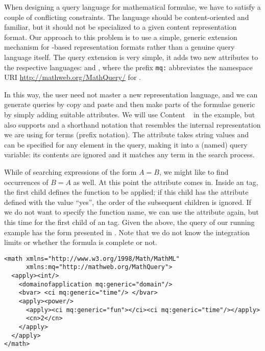 When designing a query language for mathematical formulae, we have to satisfy a couple of
conflicting constraints. The language should be content-oriented and familiar, but it
should not be specialized to a given content representation format.  Our approach to this
problem is to use a simple, generic extension mechanism for {\xml}-based representation
formats rather than a genuine query language itself.  The query extension is very simple,
it adds two new attributes to the respective languages:
{} and {}, where
the prefix {\tt{mq:}} abbreviates the namespace URI \url{http://mathweb.org/MathQuery/}
for {\mmlsearch}.

In this way, the user need not master a new representation language, and we can generate
queries by copy and paste and then make parts of the formulae generic by simply adding
suitable attributes. We will use Content {\mathml}~\cite{CarIon:MathML03} in the example,
but {\mmlsearch} also supports {\openmath} and a shorthand notation that resembles the
internal representation we are using for terms (prefix notation).  The
{} attribute takes string values and can be specified
for any element in the query, making it into a (named) query variable: its contents are
ignored and it matches any term in the search process.  

While of searching expressions of the form $A = B$, we might like to find occurrences of
$B = A$ as well. At this point the {} attribute comes
in.  Inside an {} tag, the first child defines the function to be applied;
if this child has the attribute {} defined with the
value ``yes'', the order of the subsequent children is ignored.  If we do not want to
specify the function name, we can use the {} attribute
again, but this time for the first child of an {} tag.  Given the above,
the query of our running example has the form presented in
{}. Note that we do not know the integration limits or whether
the formula is complete or not.

\begin{lstlisting}[label=lst:runningex-query,caption=Query for Signal Power,numbers=none]
<math xmlns="http://www.w3.org/1998/Math/MathML" 
      xmlns:mq="http://mathweb.org/MathQuery">
  <apply><int/>
    <domainofapplication mq:generic="domain"/> 
    <bvar> <ci mq:generic="time"/> </bvar>
    <apply><power/>
      <apply><ci mq:generic="fun"></ci><ci mq:generic="time"/></apply>
      <cn>2</cn>
    </apply>
  </apply>
</math>
\end{lstlisting}

